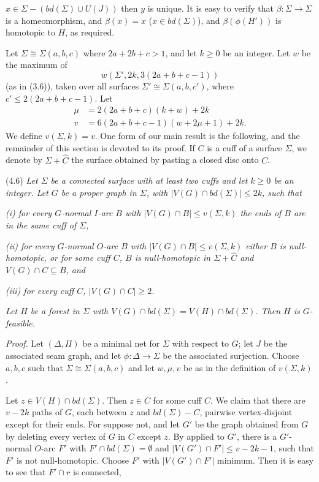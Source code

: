 \noindent $x \in \Sigma - (bd(\Sigma) \cup U(J))$ then $y$ is unique. It is easy to verify that $\beta \colon \Sigma \to \Sigma$ is a homeomorphism, and $\beta(x) = x$ ($x \in bd(\Sigma)$), and $\beta(\phi(H'))$ is homotopic to $H$, as required.

Let $\Sigma \cong \Sigma(a, b, c)$ where $2a + 2b + c > 1$, and let $k \ge 0$ be an integer. Let $w$ be the maximum of
\begin{equation*}
w(\Sigma', 2k, 3(2a + b + c - 1))
\end{equation*}
(as in (3.6)), taken over all surfaces $\Sigma' \cong \Sigma(a, b, c')$, where $c' \le 2(2a + b + c - 1)$. Let
\begin{align*}
\mu &= 2(2a + b + c)(k + w) + 2k \\
v &= 6(2a + b + c - 1)(w + 2\mu + 1) + 2k.
\end{align*}
We define $v(\Sigma, k) = v$. One form of our main result is the following, and the remainder of this section is devoted to its proof. If $C$ is a cuff of a surface $\Sigma$, we denote by $\Sigma + \hat{C}$ the surface obtained by pasting a closed disc onto $C$.

\stmt
(4.6) \textit{Let $\Sigma$ be a connected surface with at least two cuffs and let $k \ge 0$ be an integer. Let $G$ be a proper graph in $\Sigma$, with $|V(G) \cap bd(\Sigma)| \le 2k$, such that}

\textit{(i) for every $G$-normal $I$-arc $B$ with $|V(G) \cap B| \le v(\Sigma, k)$ the ends of $B$ are in the same cuff of $\Sigma$,}

\textit{(ii) for every $G$-normal $O$-arc $B$ with $|V(G) \cap B| \le v(\Sigma, k)$ either $B$ is null-homotopic, or for some cuff $C$, $B$ is null-homotopic in $\Sigma + \hat{C}$ and $V(G) \cap C \subseteq B$, and}

\textit{(iii) for every cuff $C$, $|V(G) \cap C| \ge 2$.}

\textit{Let $H$ be a forest in $\Sigma$ with $V(G) \cap bd(\Sigma) = V(H) \cap bd(\Sigma)$. Then $H$ is $G$-feasible.}

\textit{Proof.} Let $(\Delta, \Pi)$ be a minimal net for $\Sigma$ with respect to $G$; let $J$ be the associated seam graph, and let $\phi \colon \Delta \to \Sigma$ be the associated surjection. Choose $a, b, c$ such that $\Sigma \cong \Sigma(a, b, c)$ and let $w, \mu, v$ be as in the definition of $v(\Sigma, k)$.

Let $z \in V(H) \cap bd(\Sigma)$. Then $z \in C$ for some cuff $C$. We claim that there are $v - 2k$ paths of $G$, each between $z$ and $bd(\Sigma) - C$, pairwise vertex-disjoint except for their ends. For suppose not, and let $G'$ be the graph obtained from $G$ by deleting every vertex of $G$ in $C$ except $z$. By  applied to $G'$, there is a $G'$-normal $O$-arc $F'$ with $F' \cap bd(\Sigma) = \emptyset$ and $|V(G') \cap F'| \le v - 2k - 1$, such that $F'$ is not null-homotopic. Choose $F'$ with $|V(G') \cap F'|$ minimum. Then it is easy to see that $F' \cap r$ is connected,

